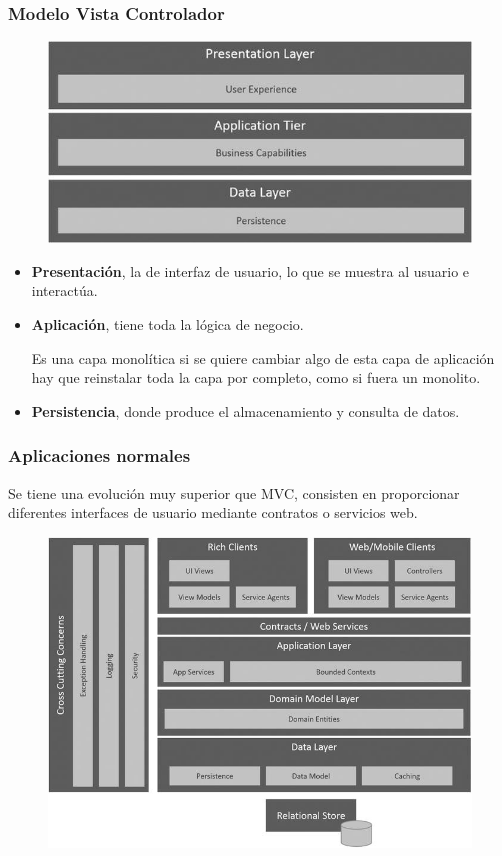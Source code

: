 \documentclass[12pt]{report} %
\begin{document}
\subsubsection{Modelo Vista Controlador}
\begin{figure}[H]
	{\includegraphics[scale=.8]{9781484212769_Fig03-01.jpg}}
\end{figure}
\begin{itemize}
	\item \textbf{Presentación}, la de interfaz de usuario, lo que se muestra al usuario e interactúa.
	\item \textbf{Aplicación}, tiene toda la lógica de negocio.
	
	Es una capa monolítica si se quiere cambiar algo de esta capa de aplicación hay que reinstalar toda la capa por completo, como si fuera un monolito.
	
	\item \textbf{Persistencia}, donde produce el almacenamiento y consulta de datos.
\end{itemize}
\pagebreak
\subsubsection{Aplicaciones normales}

Se tiene una evolución muy superior que MVC, consisten en proporcionar diferentes interfaces de usuario mediante contratos o servicios web.

\begin{figure}[H]
	{\includegraphics[scale=.8]{9781484212769_Fig03-02.jpg}}
\end{figure}
\end{document}
